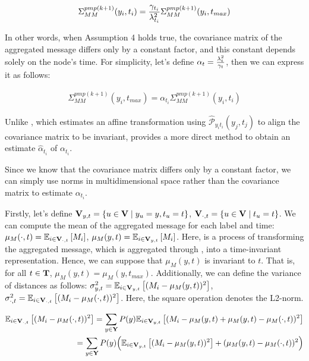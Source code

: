 \begin{align}
\Sigma^{pmp(k+1)}_{MM}(y_i,t_i)= {\gamma_{t_i} \over \lambda_{t_i}^2}\Sigma^{pmp(k+1)}_{MM}(y_i,t_{max})
\end{align}

In other words, when Assumption 4 holds true, the covariance matrix of the aggregated message differs only by a constant factor, and this constant depends solely on the node's time. For simplicity, let's define $\alpha_{t} = {\lambda_{t}^2 \over \gamma_t}$, then we can express it as follows:

\begin{align}
\Sigma^{pmp(k+1)}_{MM}(y_i,t_{max})=\alpha_{t_i}\Sigma^{pmp(k+1)}_{MM}(y_i,t_i)
\end{align}

Unlike \PNY, which estimates an affine transformation using $\hat{\mathcal{P}}_{y_i t_i}(y_j, t_j)$ to align the covariance matrix to be invariant, \JJnorm provides a more direct method to obtain an estimate $\hat{\alpha}_{t_i}$ of $\alpha_{t_i}$.

Since we know that the covariance matrix differs only by a constant factor, we can simply use norms in multidimensional space rather than the covariance matrix to estimate $\alpha_{t_i}$.


Firstly, let's define $\bold{V}_{y,t} = \{u \in \bold{V} \mid y_u=y, t_u=t\}$, $\bold{V}_{\cdot,t} = \{u \in \bold{V} \mid t_u=t\}$. We can compute the mean of the aggregated message for each label and time: $\mu_M(\cdot,t) = \mathbb{E}_{i\in \bold{V}_{\cdot,t}}\left[M_i\right]$, $\mu_M(y,t) = \mathbb{E}_{i\in \bold{V}_{y,t}}\left[M_i\right]$. Here, \JJnorm is a process of transforming the aggregated message, which is aggregated through \PMP, into a time-invariant representation. Hence, we can suppose that $\mu_M(y,t)$ is invariant to $t$. That is, for all $t\in\bold{T}$, $\mu_M(y,t)=\mu_M(y,t_{max})$. Additionally, we can define the variance of distances as follows: $\sigma_{y,t}^2=\mathbb{E}_{i\in \bold{V}_{y,t}}\left[(M_i-\mu_M(y,t))^2\right]$, $\sigma_{\cdot,t}^2=\mathbb{E}_{i\in \bold{V}_{\cdot,t}}\left[(M_i-\mu_M(\cdot,t))^2\right]$. Here, the square operation denotes the L2-norm.

\begin{align}
\mathbb{E}_{i\in \bold{V}_{\cdot,t}}\left[(M_i-\mu_M(\cdot,t))^2\right] = \sum_{y\in \bold{Y}}P(y)\mathbb{E}_{i\in \bold{V}_{y,t}}\left[ (M_i - \mu_M(y,t)+\mu_M(y,t)-\mu_M(\cdot,t))^2\right]\\=\sum_{y\in \bold{Y}}P(y)\Big(\mathbb{E}_{i\in \bold{V}_{y,t}}\left[ (M_i - \mu_M(y,t))^2 \right] +(\mu_M(y,t)-\mu_M(\cdot,t))^2\Big)
\end{align}

